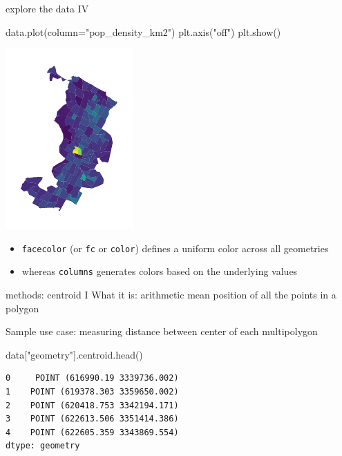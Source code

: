 \documentclass[
  ignorenonframetext,
]{beamer}
\newenvironment{Shaded}{\begin{snugshade}}{\end{snugshade}}
\newcommand{\NormalTok}[1]{\textcolor[rgb]{0.00,0.23,0.31}{#1}}
\newcommand{\OperatorTok}[1]{\textcolor[rgb]{0.37,0.37,0.37}{#1}}
\newcommand{\StringTok}[1]{\textcolor[rgb]{0.13,0.47,0.30}{#1}}
\providecommand{\tightlist}{%
  \setlength{\itemsep}{0pt}\setlength{\parskip}{0pt}}\usepackage{longtable,booktabs,array}
\begin{document}
\begin{frame}[fragile]{explore the data IV}
\label{explore-the-data-iv}
\begin{Shaded}
\begin{Highlighting}[]
\NormalTok{data.plot(column}\OperatorTok{=}\StringTok{"pop\_density\_km2"}\NormalTok{)}
\NormalTok{plt.axis(}\StringTok{"off"}\NormalTok{)}
\NormalTok{plt.show()}
\end{Highlighting}
\end{Shaded}

\includegraphics{spatial_2_files/figure-beamer/cell-16-output-1.pdf}

\begin{itemize}
\tightlist
\item
  \texttt{facecolor} (or \texttt{fc} or \texttt{color}) defines a
  uniform color across all geometries
\item
  whereas \texttt{columns} generates colors based on the underlying
  values
\end{itemize}
\end{frame}

\begin{frame}[fragile]{methods: centroid I}
\label{methods-centroid-i}
What it is: arithmetic mean position of all the points in a polygon

Sample use case: measuring distance between center of each multipolygon

\begin{Shaded}
\begin{Highlighting}[]
\NormalTok{data[}\StringTok{"geometry"}\NormalTok{].centroid.head()}
\end{Highlighting}
\end{Shaded}

\begin{verbatim}
0     POINT (616990.19 3339736.002)
1    POINT (619378.303 3359650.002)
2    POINT (620418.753 3342194.171)
3    POINT (622613.506 3351414.386)
4    POINT (622605.359 3343869.554)
dtype: geometry
\end{verbatim}
\end{frame}
\end{document}
